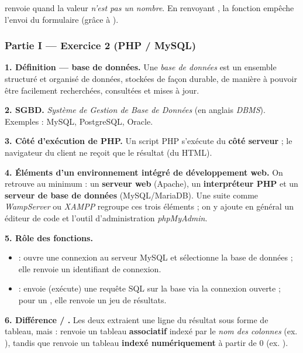 \begin{remarque}
 renvoie  quand la valeur \emph{n'est pas un
nombre}. En renvoyant , la fonction empêche l'envoi du formulaire
(grâce à ).
\end{remarque}

\subsubsection*{Partie I — Exercice 2 (PHP / MySQL)}

\textbf{1. Définition — base de données.} Une \emph{base de données} est un
ensemble structuré et organisé de données, stockées de façon durable, de manière
à pouvoir être facilement recherchées, consultées et mises à jour.

\medskip
\textbf{2. SGBD.} \emph{Système de Gestion de Base de Données} (en anglais
\emph{DBMS}). Exemples : MySQL, PostgreSQL, Oracle.

\medskip
\textbf{3. Côté d'exécution de PHP.} Un script PHP s'exécute du \textbf{côté
serveur} ; le navigateur du client ne reçoit que le résultat (du HTML).

\medskip
\textbf{4. Éléments d'un environnement intégré de développement web.} On retrouve
au minimum : un \textbf{serveur web} (Apache), un \textbf{interpréteur PHP} et un
\textbf{serveur de base de données} (MySQL/MariaDB). Une suite comme
\emph{WampServer} ou \emph{XAMPP} regroupe ces trois éléments ; on y ajoute en
général un éditeur de code et l'outil d'administration \emph{phpMyAdmin}.

\medskip
\textbf{5. Rôle des fonctions.}
\begin{itemize}
\item {} : ouvre une connexion au serveur MySQL et
sélectionne la base de données ; elle renvoie un identifiant de connexion.
\item {} : envoie (exécute) une requête SQL sur la base via
la connexion ouverte ; pour un , elle renvoie un jeu de résultats.
\end{itemize}

\medskip
\textbf{6. Différence  / .}
Les deux extraient une ligne du résultat sous forme de tableau, mais :
 renvoie un tableau \textbf{associatif} indexé par
le \emph{nom des colonnes} (ex. ), tandis que
 renvoie un tableau \textbf{indexé numériquement} à
partir de 0 (ex. ).

